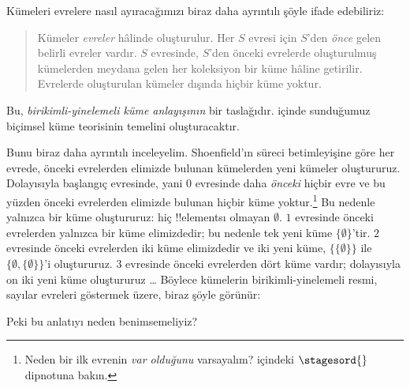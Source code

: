 


Kümeleri evrelere nasıl ayıracağımızı biraz daha ayrıntılı şöyle ifade
edebiliriz:
\begin{quote}
  Kümeler \emph{evreler} hâlinde oluşturulur. Her $S$ evresi için $S$'den
  \emph{önce} gelen belirli evreler vardır. $S$ evresinde, $S$'den önceki
  evrelerde oluşturulmuş kümelerden meydana gelen her koleksiyon bir küme
  hâline getirilir. Evrelerde oluşturulan kümeler dışında hiçbir küme yoktur.
  \citep[p.~323]{Shoenfield:AST}
\end{quote}
Bu, \emph{birikimli-yinelemeli küme anlayışının} bir taslağıdır.
 içinde sunduğumuz biçimsel küme teorisinin temelini
oluşturacaktır.

Bunu biraz daha ayrıntılı inceleyelim. Shoenfield'ın süreci betimleyişine
göre her evrede, önceki evrelerden elimizde bulunan kümelerden yeni kümeler
oluştururuz. Dolayısıyla başlangıç evresinde, yani $0$ evresinde daha
\emph{önceki} hiçbir evre ve bu yüzden önceki evrelerden elimizde bulunan
hiçbir küme yoktur.\footnote{Neden bir ilk evrenin \emph{var olduğunu}
varsayalım?  içindeki $\stagesord{}$ dipnotuna bakın.}
Bu nedenle yalnızca bir küme oluştururuz: hiç !!{element}s{}ı olmayan
$\emptyset$. $1$ evresinde önceki evrelerden yalnızca bir küme elimizdedir;
bu nedenle tek yeni küme $\{\emptyset\}$'tir. $2$ evresinde önceki evrelerden
iki küme elimizdedir ve iki yeni küme, $\{\{\emptyset\}\}$ ile
$\{\emptyset,\{\emptyset\}\}$'i oluştururuz. $3$ evresinde önceki
evrelerden dört küme vardır; dolayısıyla on iki yeni küme oluştururuz
\ldots{} Böylece kümelerin birikimli-yinelemeli resmi, sayılar evreleri
göstermek üzere, biraz şöyle görünür:
\begin{center}
\end{center}
Peki bu anlatıyı neden benimsemeliyiz?

